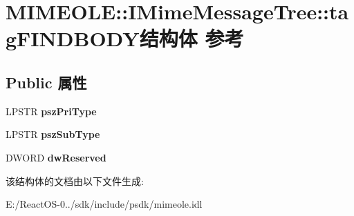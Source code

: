\hypertarget{struct_m_i_m_e_o_l_e_1_1_i_mime_message_tree_1_1tag_f_i_n_d_b_o_d_y}{}\section{M\+I\+M\+E\+O\+LE\+:\+:I\+Mime\+Message\+Tree\+:\+:tag\+F\+I\+N\+D\+B\+O\+D\+Y结构体 参考}
\label{struct_m_i_m_e_o_l_e_1_1_i_mime_message_tree_1_1tag_f_i_n_d_b_o_d_y}
\subsection*{Public 属性}
\begin{DoxyCompactItemize}
\item 
\mbox{\label{struct_m_i_m_e_o_l_e_1_1_i_mime_message_tree_1_1tag_f_i_n_d_b_o_d_y_a057bd23b003e5c32f2d96421835bae78}} 
L\+P\+S\+TR {\bfseries psz\+Pri\+Type}
\item 
\mbox{\label{struct_m_i_m_e_o_l_e_1_1_i_mime_message_tree_1_1tag_f_i_n_d_b_o_d_y_a9356d862ee8869fab04afa53a9c9cac8}} 
L\+P\+S\+TR {\bfseries psz\+Sub\+Type}
\item 
\mbox{\label{struct_m_i_m_e_o_l_e_1_1_i_mime_message_tree_1_1tag_f_i_n_d_b_o_d_y_afcf7b3cd9e14fb78ca58c0fa66dedc1f}} 
D\+W\+O\+RD {\bfseries dw\+Reserved}
\end{DoxyCompactItemize}


该结构体的文档由以下文件生成\+:\begin{DoxyCompactItemize}
\item 
E\+:/\+React\+O\+S-\/0../sdk/include/psdk/mimeole.\+idl\end{DoxyCompactItemize}
